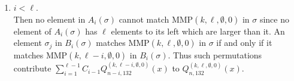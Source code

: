 \documentclass[
final,nomarks
]{dmtcs-episciences}
\newcommand{\Qmmn}[2]{Q_{#2,132}^{(#1)}(x)}
\newcommand{\MMP}{\mathrm{MMP}}
\begin{document}
\begin{enumerate}[{\bf Case }\bf 1.]
\item \begin{math}i <  \ell\end{math}. \\
Then no element in \begin{math}A_i(\sigma)\end{math} cannot match \begin{math}\MMP(k,\ell,\emptyset,0)\end{math} 
in \begin{math}\sigma\end{math} since no element of \begin{math}A_i(\sigma)\end{math} has \begin{math}\ell\end{math} elements to its left which are larger than it. 
An element \begin{math}\sigma_j\end{math} in \begin{math}B_i(\sigma)\end{math} matches 
\begin{math}\MMP(k,\ell,\emptyset,0)\end{math} in \begin{math}\sigma\end{math} if and only if it matches \begin{math}\MMP(k,\ell-i,\emptyset,0)\end{math} in 
\begin{math}B_i(\sigma)\end{math}.  Thus such permutations contribute 
\begin{math}\sum_{i=1}^{\ell-1}C_{i-1}\Qmmn{k,\ell-i,\emptyset,0}{n-i}\end{math} to  \begin{math}\Qmmn{k,\ell,\emptyset,0}{n}\end{math}.


\end{enumerate}
\end{document}
